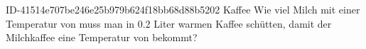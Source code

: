 \begin{exercise}
      {ID-41514e707be246e25b979b624f18bb68d88b5202}
      {Kaffee}
  \ifproblem\problem
    Wie viel Milch mit einer Temperatur von  muss man in \num{0.2} Liter
     warmen Kaffee schütten, damit der Milchkaffee eine Temperatur
    von  bekommt?
  \fi
\end{exercise}
